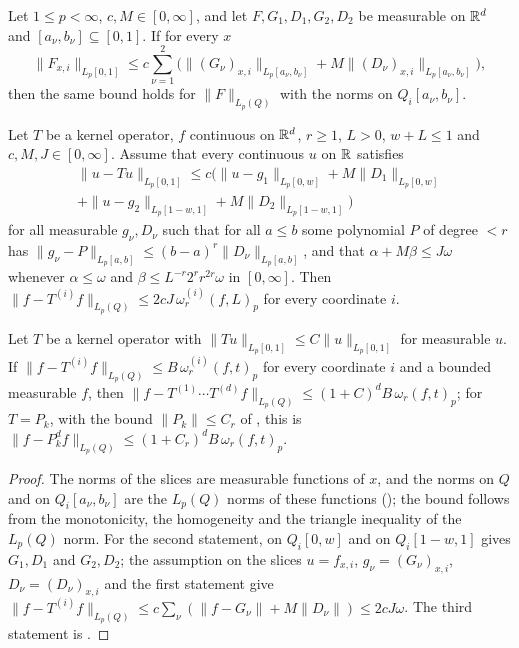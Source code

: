\begin{lemma}
\label{lem:slices-to-cube}
\leanok
{}
Let $1 \leq p < \infty$, $c, M \in [0, \infty]$, and let $F, G_1, D_1, G_2, D_2$ be measurable
on $\mathbb{R}^d$
and $[a_\nu, b_\nu] \subseteq [0, 1]$. If for every $x$
\[
  \|F_{x,i}\|_{L_p[0,1]} \leq c \sum_{\nu = 1}^2 \bigl( \|(G_\nu)_{x,i}\|_{L_p[a_\nu, b_\nu]}
    + M \|(D_\nu)_{x,i}\|_{L_p[a_\nu, b_\nu]} \bigr) ,
\]
then the same bound holds for $\|F\|_{L_p(Q)}$ with the norms on $Q_i[a_\nu, b_\nu]$.

Let $T$ be a kernel operator, $f$ continuous on $\mathbb{R}^d$, $r \geq 1$, $L > 0$, $w + L \leq 1$ and
$c, M, J \in [0, \infty]$. Assume that every continuous $u$ on $\mathbb{R}$ satisfies
\begin{multline*}
  \|u - T u\|_{L_p[0,1]} \leq c \bigl( \|u - g_1\|_{L_p[0, w]} + M \|D_1\|_{L_p[0, w]} \\
    + \|u - g_2\|_{L_p[1 - w, 1]} + M \|D_2\|_{L_p[1 - w, 1]} \bigr)
\end{multline*}
for all measurable $g_\nu, D_\nu$ such that for all $a \leq b$ some polynomial $P$ of degree
$< r$ has $\|g_\nu - P\|_{L_p[a,b]} \leq (b - a)^r \|D_\nu\|_{L_p[a,b]}$, and that
$\alpha + M \beta \leq J \omega$ whenever $\alpha \leq \omega$ and
$\beta \leq L^{-r} 2^r r^{2r} \omega$ in $[0, \infty]$. Then
$\|f - T^{(i)} f\|_{L_p(Q)} \leq 2 c J \, \omega_r^{(i)}(f, L)_p$ for every coordinate $i$.

Let $T$ be a kernel operator with $\|T u\|_{L_p[0,1]} \leq C \|u\|_{L_p[0,1]}$ for measurable
$u$. If $\|f - T^{(i)} f\|_{L_p(Q)} \leq B \, \omega_r^{(i)}(f, t)_p$ for every coordinate $i$
and a bounded measurable $f$, then
$\|f - T^{(1)} \cdots T^{(d)} f\|_{L_p(Q)} \leq (1 + C)^d B \, \omega_r(f, t)_p$; for $T = P_k$,
with the bound $\|P_k\| \leq C_r$ of , this is
$\|f - P^d_k f\|_{L_p(Q)} \leq (1 + C_r)^d B \, \omega_r(f, t)_p$.
\end{lemma}

\begin{proof}
\leanok
The norms of the slices are measurable functions of $x$, and the norms on $Q$ and on
$Q_i[a_\nu, b_\nu]$ are the $L_p(Q)$ norms of these functions (); the
bound follows from the monotonicity, the homogeneity and the triangle inequality of the
$L_p(Q)$ norm. For the second statement,  on $Q_i[0, w]$ and
on $Q_i[1 - w, 1]$ gives $G_1, D_1$ and $G_2, D_2$; the assumption on the slices
$u = f_{x,i}$, $g_\nu = (G_\nu)_{x,i}$, $D_\nu = (D_\nu)_{x,i}$ and the first statement give
$\|f - T^{(i)} f\|_{L_p(Q)} \leq c \sum_{\nu} (\|f - G_\nu\| + M \|D_\nu\|) \leq 2 c J \omega$.
The third statement is .
\end{proof}

